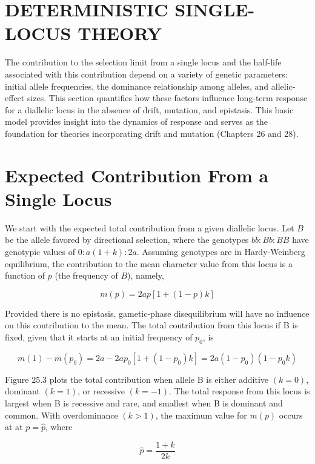 \documentclass{article}
\begin{document}
\section{DETERMINISTIC SINGLE-LOCUS THEORY}
The contribution to the selection limit from a single locus and the half-life associated with this contribution depend on a variety of genetic parameters: initial allele frequencies, the dominance relationship among alleles, and allelic-effect sizes. This section quantifies how these factors influence long-term response for a diallelic locus in the absence of drift, mutation, and epistasis. This basic model provides insight into the dynamics of response and serves as the foundation for theories incorporating drift and mutation (Chapters 26 and 28).

\section{Expected Contribution From a Single Locus}
We start with the expected total contribution from a given diallelic locus. Let $B$ be the allele favored by directional selection, where the genotypes $bb:Bb:BB$ have genotypic values of $0:a(1+k):2a$. Assuming genotypes are in Hardy-Weinberg equilibrium, the contribution to the mean character value from this locus is a function of $p$ (the frequency of $B$), namely,

\begin{equation}
m(p)=2ap\left[1+(1-p)k\right]
\tag{25.1a}
\label{eq:25_1a}
\end{equation}

Provided there is no epistasis, gametic-phase disequilibrium will have no influence on this contribution to the mean. The total contribution from this locus if B is fixed, given that it starts at an initial frequency of  $ p_{0} $, is

\begin{equation}
m(1)-m(p_{0})=2a-2ap_{0}\left[1+(1-p_{0})k\right]=2a\left(1-p_{0}\right)(1-p_{0}k)
\tag{25.1b}
\label{eq:25_1b}
\end{equation}

Figure 25.3 plots the total contribution when allele B is either additive  $ (k = 0) $, dominant  $ (k = 1) $, or recessive  $ (k = -1) $. The total response from this locus is largest when B is recessive and rare, and smallest when B is dominant and common. With overdominance  $ (k > 1) $, the maximum value for  $ m(p) $ occurs at at  $ p = \widehat{p} $, where

\begin{equation}
\widehat{p}=\frac{1+k}{2k}
\tag{25.1c}
\label{eq:25_1c}
\end{equation}
\end{document}
